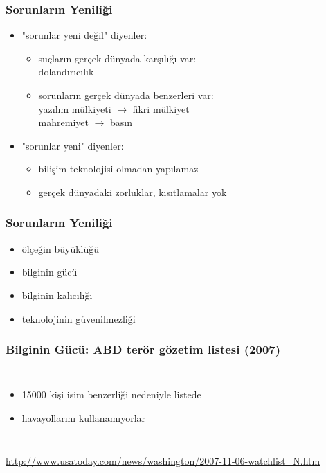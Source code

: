 \documentclass[dvipsnames]{beamer}
\theoremstyle{definition}
\theoremstyle{example}
\theoremstyle{plain}
\begin{document}
\begin{frame}
  \frametitle{Sorunların Yeniliği}

  \begin{itemize}
    \item "sorunlar yeni değil" diyenler:
    \begin{itemize}
      \item suçların gerçek dünyada karşılığı var:\\
        dolandırıcılık
      \item sorunların gerçek dünyada benzerleri var:\\
        yazılım mülkiyeti $\rightarrow$ fikri mülkiyet\\
        mahremiyet $\rightarrow$ basın
    \end{itemize}

    \pause
    \medskip
    \item "sorunlar yeni" diyenler:
    \begin{itemize}
      \item bilişim teknolojisi olmadan yapılamaz
      \item gerçek dünyadaki zorluklar, kısıtlamalar yok
    \end{itemize}
  \end{itemize}
\end{frame}

\begin{frame}
  \frametitle{Sorunların Yeniliği}

  \begin{itemize}
    \item ölçeğin büyüklüğü
    \item bilginin gücü
    \item bilginin kalıcılığı
    \item teknolojinin güvenilmezliği
  \end{itemize}
\end{frame}

\begin{frame}
  \frametitle{Bilginin Gücü: ABD terör gözetim listesi (2007)}

  \begin{columns}

    \begin{itemize}
      \item 15000 kişi isim benzerliği nedeniyle listede
      \item havayollarını kullanamıyorlar
    \end{itemize}
  \end{columns}

  \medskip
  \tiny{\url{http://www.usatoday.com/news/washington/2007-11-06-watchlist_N.htm}}
\end{frame}
\end{document}
